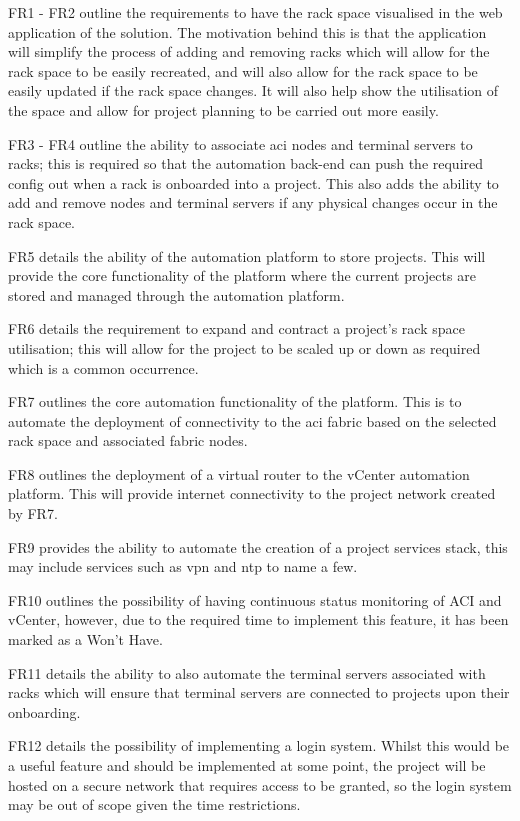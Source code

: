 FR1 - FR2 outline the requirements to have the rack space visualised in the web application of the solution. The motivation behind this is that the application will simplify the process of adding and removing racks which will allow for the rack space to be easily recreated, and will also allow for the rack space to be easily updated if the rack space changes.
It will also help show the utilisation of the space and allow for project planning to be carried out more easily.

FR3 - FR4 outline the ability to associate \gls{aci} nodes and terminal servers to racks; this is required so that the automation back-end can push the required config out when a rack is onboarded into a project. This also adds the ability to add and remove nodes and terminal servers if any physical changes occur in the rack space.

FR5 details the ability of the automation platform to store projects. This will provide the core functionality of the platform where the current projects are stored and managed through the automation platform.

FR6 details the requirement to expand and contract a project's rack space utilisation; this will allow for the project to be scaled up or down as required which is a common occurrence.

FR7 outlines the core automation functionality of the platform. This is to automate the deployment of connectivity to the \gls{aci} fabric based on the selected rack space and associated fabric nodes.

FR8 outlines the deployment of a virtual router to the vCenter automation platform. This will provide internet connectivity to the project network created by FR7.

FR9 provides the ability to automate the creation of a project services stack, this may include services such as \gls{vpn} and \gls{ntp} to name a few.

FR10 outlines the possibility of having continuous status monitoring of ACI and vCenter, however, due to the required time to implement this feature, it has been marked as a Won’t Have.

FR11 details the ability to also automate the terminal servers associated with racks which will ensure that terminal servers are connected to projects upon their onboarding.

FR12 details the possibility of implementing a login system. Whilst this would be a useful feature and should be implemented at some point, the project will be hosted on a secure network that requires access to be granted, so the login system may be out of scope given the time restrictions.

